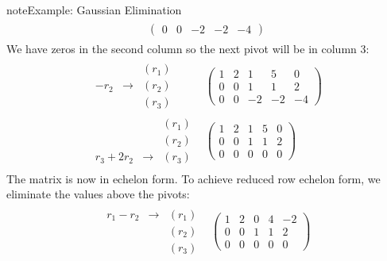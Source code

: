 \documentclass[letterpaper,10pt,english]{jupyterBook}
\begin{document}
\begin{sphinxadmonition}{note}{Example: Gaussian Elimination}
\begin{equation*}
\begin{split}
\begin{array}{rc}
\begin{pmatrix}
0 & 0 & -2 & -2 & -4
\end{pmatrix}
\end{array}
\end{split}
\end{equation*}
\sphinxAtStartPar
We have zeros in the second column so the next pivot will be in column 3:
\begin{equation*}
\begin{split}
\begin{array}{rc}
\begin{array}{ccr}
 & & (r_1)\\
 -r_2 & \longrightarrow & (r_2)\\
 & & (r_3)
\end{array}
&
\begin{pmatrix}
\boxed{1} & 2 & 1 & 5 & 0\\
0 & 0 & 1 & 1 & 2\\
0 & 0 & -2 & -2 & -4
\end{pmatrix}\\
\begin{array}{ccr}
 & & (r_1)\\
 & & (r_2)\\
 r_3 + 2r_2 & \longrightarrow & (r_3)
\end{array}
&
\begin{pmatrix}
\boxed{1} & 2 & 1 & 5 & 0\\
0 & 0 & \boxed{1} & 1 & 2\\
0 & 0 & 0 & 0 & 0
\end{pmatrix}
\end{array}
\end{split}
\end{equation*}
\sphinxAtStartPar
The matrix is now in echelon form. To achieve reduced row echelon form, we eliminate the values above the pivots:
\begin{equation*}
\begin{split}
\begin{array}{rc}
\begin{array}{ccr}
 r_1 - r_2 & \longrightarrow & (r_1)\\
 & & (r_2)\\
 & & (r_3)
\end{array}
&
\begin{pmatrix}
\boxed{1} & 2 & 0 & 4 & -2\\
0 & 0 & \boxed{1} & 1 & 2\\
0 & 0 & 0 & 0 & 0
\end{pmatrix}\\
\end{array}
\end{split}
\end{equation*}\end{sphinxadmonition}
 \label{exercise:q_echelon_form_2}
\end{document}

